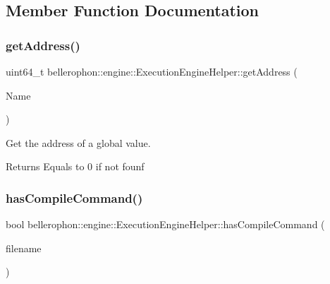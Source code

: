 \subsection{Member Function Documentation}
\hypertarget{classbellerophon_1_1engine_1_1ExecutionEngineHelper_a9b72393d74d77555c1306abbdd930007}{}\label{classbellerophon_1_1engine_1_1ExecutionEngineHelper_a9b72393d74d77555c1306abbdd930007} 
\subsubsection{\texorpdfstring{get\+Address()}{getAddress()}}
{\footnotesize\ttfamily uint64\+\_\+t bellerophon\+::engine\+::\+Execution\+Engine\+Helper\+::get\+Address (\begin{DoxyParamCaption}\item[{\+::llvm\+::\+String\+Ref}]{Name }\end{DoxyParamCaption})}



Get the address of a global value. 

\begin{DoxyReturn}{Returns}
Equals to 0 if not founf 
\end{DoxyReturn}
\hypertarget{classbellerophon_1_1engine_1_1ExecutionEngineHelper_a630f6808c11ca5c1dca005836af9ed59}{}\label{classbellerophon_1_1engine_1_1ExecutionEngineHelper_a630f6808c11ca5c1dca005836af9ed59} 
\subsubsection{\texorpdfstring{has\+Compile\+Command()}{hasCompileCommand()}}
{\footnotesize\ttfamily bool bellerophon\+::engine\+::\+Execution\+Engine\+Helper\+::has\+Compile\+Command (\begin{DoxyParamCaption}\item[{\+::llvm\+::\+String\+Ref}]{filename }\end{DoxyParamCaption})}



